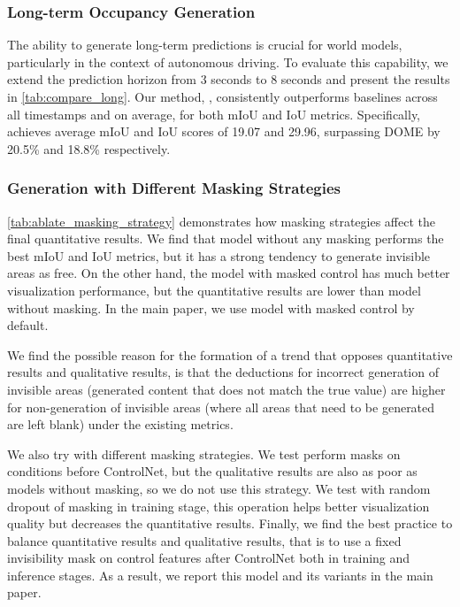 \subsubsection{Long-term Occupancy Generation}
The ability to generate long-term predictions is crucial for world models, particularly in the context of autonomous driving. 
To evaluate this capability, we extend the prediction horizon from 3 seconds to 8 seconds and present the results in \cref{tab:compare_long}. 
Our method, \mtd{}, consistently outperforms baselines across all timestamps and on average, for both mIoU and IoU metrics. 
Specifically, \mtd{} achieves average mIoU and IoU scores of 19.07 and 29.96, surpassing DOME by 20.5\% and 18.8\% respectively.

\subsubsection{Generation with Different Masking Strategies}
\cref{tab:ablate_masking_strategy} demonstrates how masking strategies affect the final quantitative results. We find that model without any masking performs the best mIoU and IoU metrics, but it has a strong tendency to generate invisible areas as free. On the other hand, the model with masked control has much better visualization performance, but the quantitative results are lower than model without masking. In the main paper, we use model with masked control by default.

We find the possible reason for the formation of a trend that opposes quantitative results and qualitative results, is that the deductions for incorrect generation of invisible areas (generated content that does not match the true value) are higher for non-generation of invisible areas (where all areas that need to be generated are left blank) under the existing metrics.

We also try with different masking strategies. We test perform masks on conditions before \mtd{} ControlNet, but the qualitative results are also as poor as models without masking, so we do not use this strategy. We test with random dropout of masking in training stage, this operation helps better visualization quality but decreases the quantitative results. Finally, we find the best practice to balance quantitative results and qualitative results, that is to use a fixed invisibility mask on control features after \mtd{} ControlNet both in training and inference stages. As a result, we report this model and its variants in the main paper.

